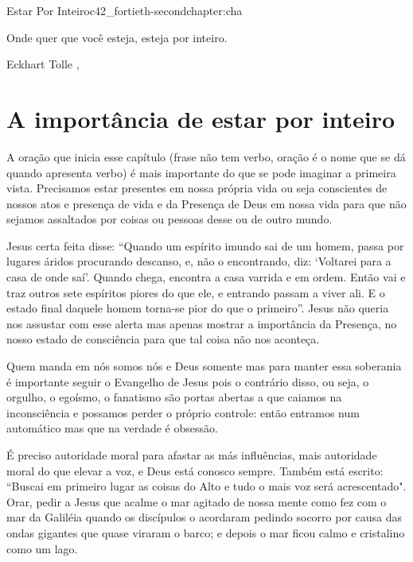 \begin{chapterpage}{Estar Por Inteiro}{c42_fortieth-secondchapter:cha}
 
\begin{myquotation}Onde quer que você esteja, esteja por inteiro.
\par\vspace*{15mm}
\mbox{}\hfill \emdash{}Eckhart Tolle
, %
\par\end{myquotation}

\end{chapterpage}



\section{A importância de estar por inteiro}\label{c1_basicformatting:sec}

\emdash{}A oração que inicia esse capítulo (frase não tem verbo, oração é o nome que se dá quando apresenta verbo) é mais importante do que se pode imaginar a primeira vista. Precisamos estar presentes em nossa própria vida ou seja conscientes de nossos atos e presença de vida e da Presença de Deus em nossa vida para que não sejamos assaltados por coisas ou pessoas desse ou de outro mundo. 

\emdash{}Jesus certa feita disse: ``Quando um espírito imundo sai de um homem, passa por lugares áridos procurando descanso, e, não o encontrando, diz: ‘Voltarei para a casa de onde saí’.  Quando chega, encontra a casa varrida e em ordem.  Então vai e traz outros sete espíritos piores do que ele, e entrando passam a viver ali. E o estado final daquele homem torna-se pior do que o primeiro”. Jesus não queria nos assustar com esse alerta mas apenas mostrar a importância da Presença, no nosso estado de consciência para que tal coisa não nos aconteça.

\emdash{}Quem manda em nós somos nós e Deus somente mas para manter essa soberania é importante seguir o Evangelho de Jesus pois o contrário disso, ou seja, o orgulho, o egoísmo, o fanatismo são portas abertas a que caiamos na inconsciência e possamos perder o próprio controle: então entramos num automático mas que na verdade é obsessão.

\emdash{}É preciso autoridade moral para afastar as más influências, mais autoridade moral do que elevar a voz, e Deus está conosco sempre. Também está escrito: ``Buscai em primeiro lugar as coisas do Alto e tudo o mais voz será acrescentado". Orar, pedir a Jesus que acalme o mar agitado de nossa mente como fez com o mar da Galiléia quando os discípulos o acordaram pedindo socorro por causa das ondas gigantes que quase viraram o barco; e depois o mar ficou calmo e cristalino como um lago.

